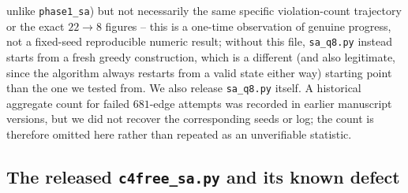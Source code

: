 \documentclass[12pt]{article}
\begin{document}
unlike \texttt{phase1\_sa}) but not necessarily the same specific
violation-count trajectory or the exact $22\to8$ figures -- this is a
one-time observation of genuine progress, not a fixed-seed
reproducible numeric result;
without this file, \texttt{sa\_q8.py} instead
starts from a fresh greedy construction, which is a different (and
also legitimate, since the algorithm always restarts from a valid
state either way) starting point than the one we tested from. We
also release \texttt{sa\_q8.py} itself. A historical aggregate count for
failed $681$-edge attempts was recorded in earlier manuscript versions, but
we did not recover the corresponding seeds or log; the count is therefore
omitted here rather than repeated as an unverifiable statistic.

\subsection{The released \texttt{c4free\_sa.py} and its known defect}\label{sec:c4freesa}
\end{document}
